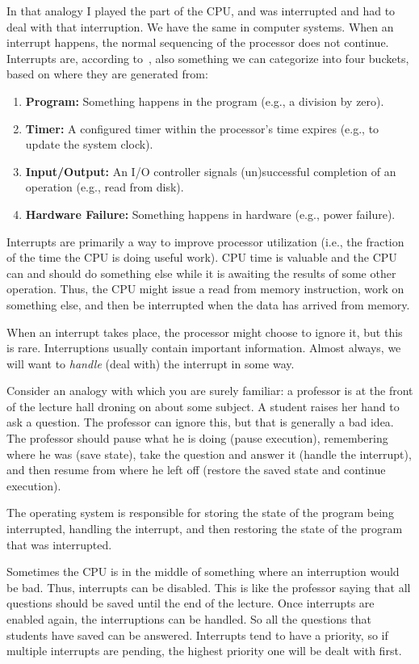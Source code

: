 In that analogy I played the part of the CPU, and was interrupted and had to deal with that interruption. We have the same in computer systems. When an interrupt happens, the normal sequencing of the processor does not continue. Interrupts are, according to~\cite{osi}, also something we can categorize into four buckets, based on where they are generated from:

\begin{enumerate}
	\item \textbf{Program:} Something happens in the program (e.g., a division by zero).
	\item \textbf{Timer:} A configured timer within the processor's time expires (e.g., to update the system clock).
	\item \textbf{Input/Output:} An I/O controller signals (un)successful completion of an operation (e.g., read from disk).
	\item \textbf{Hardware Failure:} Something happens in hardware (e.g., power failure).
\end{enumerate}

Interrupts are primarily a way to improve processor utilization (i.e., the fraction of the time the CPU is doing useful work). CPU time is valuable and the CPU can and should do something else while it is awaiting the results of some other operation. Thus, the CPU might issue a read from memory instruction, work on something else, and then be interrupted when the data has arrived from memory.

When an interrupt takes place, the processor might choose to ignore it, but this is rare. Interruptions usually contain important information. Almost always, we will want to \textit{handle} (deal with) the interrupt in some way.

Consider an analogy with which you are surely familiar: a professor is at the front of the lecture hall droning on about some subject. A student raises her hand to ask a question. The professor can ignore this, but that is generally a bad idea. The professor should pause what he is doing (pause execution), remembering where he was (save state), take the question and answer it (handle the interrupt), and then resume from where he left off (restore the saved state and continue execution).

The operating system is responsible for storing the state of the program being interrupted, handling the interrupt, and then restoring the state of the program that was interrupted.

Sometimes the CPU is in the middle of something where an interruption would be bad. Thus, interrupts can be disabled. This is like the professor saying that all questions should be saved until the end of the lecture. Once interrupts are enabled again, the interruptions can be handled. So all the questions that students have saved can be answered. Interrupts tend to have a priority, so if multiple interrupts are pending, the highest priority one will be dealt with first.

